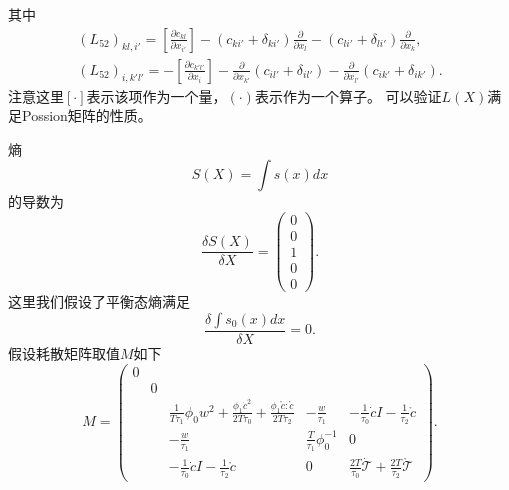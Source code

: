 	其中
	\begin{eqnarray*}
		(L_{52})_{kl,i'} = [\frac{\partial {c_{kl}}}{\partial x_{i'}}] - (c_{ki'} + \delta_{ki'}) \frac{\partial}{\partial x_l} - ( c_{li'} + \delta_{li'}) \frac{\partial}{\partial x_{k}}, \\
		(L_{52})_{i,k'l'} = -[\frac{\partial {c_{k'l'}}}{\partial x_{i}}] - \frac{\partial}{\partial x_{k'}} (c_{il'} + \delta_{il'})  - \frac{\partial}{\partial x_{l'}} ( c_{ik'} + \delta_{ik'}).
	\end{eqnarray*}
	注意这里$[\cdot]$表示该项作为一个量，$(\cdot)$表示作为一个算子。
	可以验证$L(X)$满足Possion矩阵的性质。

	熵
	\begin{equation}
		S(X) = \int s(x) dx
	\end{equation}
	的导数为
	\begin{equation*}
		\frac{\delta S(X)}{ \delta X} = \left( \begin{array}{c} 0 \\ 0 \\ 1 \\  0 \\ 0 \end{array} \right).
	\end{equation*}
	这里我们假设了平衡态熵满足
	\begin{equation}
		\frac{\delta \int s_0(x) dx}{ \delta X} = 0. 
	\end{equation}
	假设耗散矩阵取值$M$如下
	\begin{equation*}
		M = \left( \begin{array}{ccccc} 
		0 & & & & \\
		& 0 & & &  \\
		& & \frac{1}{T \tau_1} \phi_0 w^2 + \frac{\phi_1 \dot{c}^2}{2 T \tau_0} + \frac{\phi_1 \mathring{c}:\mathring{c}}{2 T \tau_2} & -\frac{w}{\tau_1} & -\frac{1}{\tau_0} \dot{c} I - \frac{1}{\tau_2} \mathring{c} \\  
		& &  -\frac{w}{\tau_1} & \frac{T}{\tau_1} \phi_0^{-1} & 0  \\
	    & &  -\frac{1}{\tau_0} \dot{c} I - \frac{1}{\tau_2} \mathring{c} & 0 & \frac{2T}{\tau_0} \dot{\mathcal{T}}   + \frac{2T}{\tau_2}  \mathring{\mathcal{T}}   
		\end{array} \right).
	\end{equation*}
